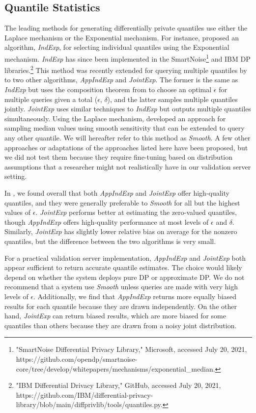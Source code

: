 \subsection{Quantile Statistics}
The leading methods for generating differentially private quantiles use either the Laplace mechanism or the Exponential mechanism. For instance, \citet{smith2011privacy} proposed an algorithm, \textit{IndExp}, for selecting individual quantiles using the Exponential mechanism. \textit{IndExp} has since been implemented in the SmartNoise\footnote{"SmartNoise Differential Privacy Library," Microsoft, accessed July 20, 2021, https://github.com/opendp/smartnoise-core/tree/develop/whitepapers/mechanisms/exponential\_median.} and IBM DP libraries.\footnote{"IBM Differential Drivacy Library," GitHub, accessed July 20, 2021, https://github.com/IBM/differential-privacy-library/blob/main/diffprivlib/tools/quantiles.py.} This method was recently extended for querying multiple quantiles by \citet{gillenwater2021differentially} to two other algorithms, \textit{AppIndExp} and \textit{JointExp}. The former is the same as \textit{IndExp} but uses the composition theorem from \citet{dong2020optimal} to choose an optimal $\epsilon$ for multiple queries given a total ($\epsilon$, $\delta$), and the latter samples multiple quantiles jointly. \textit{JointExp} uses similar techniques to \textit{IndExp} but outputs multiple quantiles simultaneously. Using the Laplace mechanism, \citet{nissim2007smooth} developed an approach for sampling median values using smooth sensitivity that can be extended to query any other quantile. We will hereafter refer to this method as \textit{Smooth}. A few other approaches or adaptations of the approaches listed here have been proposed, but we did not test them because they require fine-tuning based on distribution assumptions that a researcher might not realistically have in our validation server setting.

In \citet{barrientos2021}, we found overall that both \textit{AppIndExp} and \textit{JointExp} offer high-quality quantiles, and they were generally preferable to \textit{Smooth} for all but the highest values of $\epsilon$. \textit{JointExp} performs better at estimating the zero-valued quantiles, though \textit{AppIndExp} offers high-quality performance at most levels of $\epsilon$ and $\delta$. Similarly, \textit{JointExp} has slightly lower relative bias on average for the nonzero quantiles, but the difference between the two algorithms is very small. 

For a practical validation server implementation, \textit{AppIndExp} and \textit{JointExp} both appear sufficient to return accurate quantile estimates. The choice would likely depend on whether the system deploys pure DP or approximate DP. We do not recommend that a system use \textit{Smooth} unless queries are made with very high levels of $\epsilon$. Additionally, we find that \textit{AppIndExp} returns more equally biased results for each quantile because they are drawn independently. On the other hand, \textit{JointExp} can return biased results, which are more biased for some quantiles than others because they are drawn from a noisy joint distribution.

